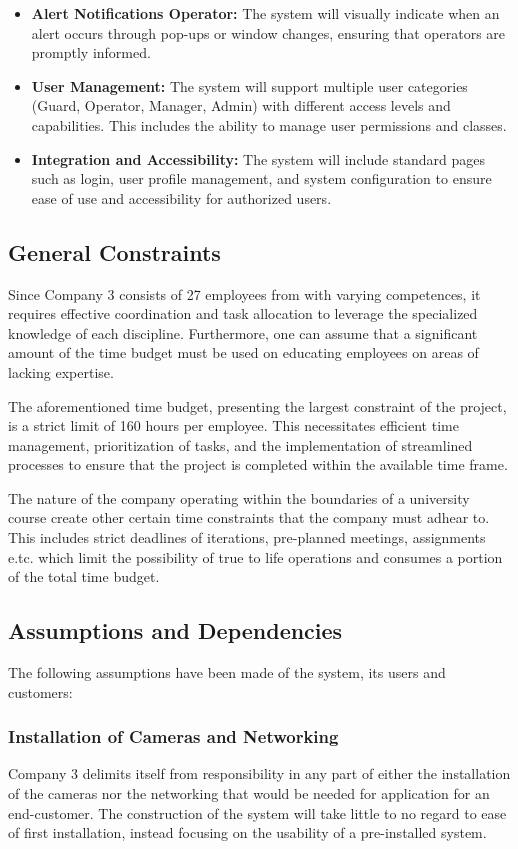 \documentclass{article}
\begin{document}
\begin{itemize}
    \item \textbf{Alert Notifications Operator:} The system will visually indicate when an alert occurs through pop-ups or window changes, ensuring that operators are promptly informed.
    \item \textbf{User Management:} The system will support multiple user categories (Guard, Operator, Manager, Admin) with different access levels and capabilities. This includes the ability to manage user permissions and classes.
    \item \textbf{Integration and Accessibility:} The system will include standard pages such as login, user profile management, and system configuration to ensure ease of use and accessibility for authorized users.
\end{itemize}

\subsection{General Constraints}
Since Company 3 consists of 27 employees from with varying competences, it requires effective coordination and task allocation to leverage the specialized knowledge of each discipline. Furthermore, one can assume that a significant amount of the time budget must be used on educating employees on areas of lacking expertise. 

The aforementioned time budget, presenting the largest constraint of the project, is a strict limit of 160 hours per employee. This necessitates efficient time management, prioritization of tasks, and the implementation of streamlined processes to ensure that the project is completed within the available time frame. 

The nature of the company operating within the boundaries of a university course create other certain time constraints that the company must adhear to. This includes strict deadlines of iterations, pre-planned meetings, assignments e.tc. which limit the possibility of true to life operations and consumes a portion of the total time budget. 

\subsection{Assumptions and Dependencies}
The following assumptions have been made of the system, its users and customers:

\subsubsection{Installation of Cameras and Networking}
Company 3 delimits itself from responsibility in any part of either the installation of the cameras nor the networking that would be needed for application for an end-customer. The construction of the system will take little to no regard to ease of first installation, instead focusing on the usability of a pre-installed system.
\end{document}
